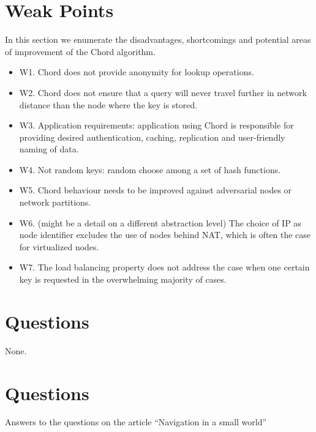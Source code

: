 \documentclass[10pt]{proc}
\begin{document}
\section{Weak Points}
In this section we enumerate the disadvantages, shortcomings and potential areas of improvement of the Chord algorithm.

\begin{itemize}
 \item W1. Chord does not provide anonymity for lookup operations.
 \item W2. Chord does not ensure that a query will never travel further in network distance than the node where the key is stored.
 \item W3. Application requirements: application using Chord is responsible for providing desired authentication, caching, replication and user-friendly naming of data.
 \item W4. Not random keys: random choose among a set of hash functions.
 \item W5. Chord behaviour needs to be improved against adversarial nodes or network partitions.
 \item W6. (might be a detail on a different abstraction level) The choice of IP as node identifier excludes the use of nodes behind NAT, which is often the case for virtualized nodes.
 \item W7. The load balancing property does not address the case when one certain key is requested in the overwhelming majority of cases.
\end{itemize}

\section{Questions}
None.


\newpage
\section{Questions}
Answers to the questions on the article ``Navigation in a small world'' \cite{kleinberg2000navigation}
\end{document}
